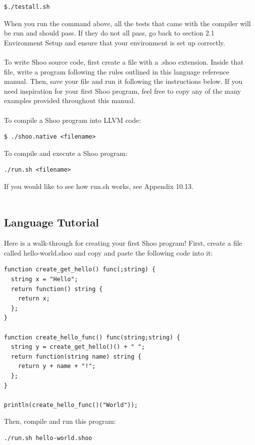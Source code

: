 \documentclass[12pt]{article}
\begin{document}
\begin{lstlisting}
$./testall.sh
\end{lstlisting}
When you run the command above, all the tests that came with the compiler will be run and should pass. If they do not all pass, go back to section 2.1 Environment Setup and ensure that your environment is set up correctly.\\
\\

To write Shoo source code, first create a file with a .shoo extension. Inside that file, write a program following the rules outlined in this language reference manual. Then, save your file and run it following the instructions below. If you need inspiration for your first Shoo program, feel free to copy any of the many examples provided throughout this manual.\\
\\

To compile a Shoo program into LLVM code:
\begin{lstlisting}
$ ./shoo.native <filename>
\end{lstlisting}

To compile and execute a Shoo program:
\begin{lstlisting}
./run.sh <filename>
\end{lstlisting}
If you would like to see how run.sh works, see Appendix 10.13.\\
\\

\subsection{Language Tutorial}
Here is a walk-through for creating your first Shoo program! First, create a file called hello-world.shoo and copy and paste the following code into it:\\
\begin{lstlisting}
function create_get_hello() func(;string) {
  string x = "Hello";
  return function() string {
    return x;
  };
}

function create_hello_func() func(string;string) {
  string y = create_get_hello()() + " ";
  return function(string name) string {
    return y + name + "!";
  };
}

println(create_hello_func()("World"));
\end{lstlisting}

Then, compile and run this program:\\
\begin{lstlisting}
./run.sh hello-world.shoo
\end{lstlisting}
\end{document}
